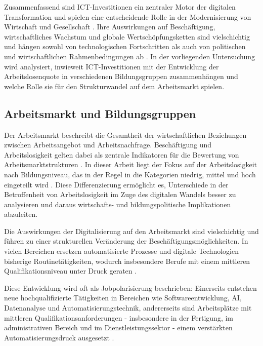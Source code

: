 Zusammenfassend sind \ac{ICT}-Investitionen ein zentraler Motor der digitalen 
Transformation und spielen eine entscheidende Rolle in der Modernisierung von Wirtschaft 
und Gesellschaft \parencite[S. 112]{brynjolfsson2015thesecond}. Ihre Auswirkungen auf 
Beschäftigung, wirtschaftliches Wachstum und globale Wertschöpfungsketten sind 
vielschichtig und hängen sowohl von technologischen Fortschritten als auch von politischen 
und wirtschaftlichen Rahmenbedingungen ab \parencite[S. 112]{brynjolfsson2015thesecond}. 
In der vorliegenden Untersuchung wird analysiert, inwieweit \ac{ICT}-Investitionen mit der 
Entwicklung der Arbeitslosenquote in verschiedenen Bildungsgruppen zusammenhängen und 
welche Rolle sie für den Strukturwandel auf dem Arbeitsmarkt spielen.


\subsection{Arbeitsmarkt und Bildungsgruppen}

Der Arbeitsmarkt beschreibt die Gesamtheit der wirtschaftlichen Beziehungen zwischen 
Arbeitsangebot und Arbeitsnachfrage. Beschäftigung und Arbeitslosigkeit gelten dabei als 
zentrale Indikatoren für die Bewertung von Arbeitsmarktstrukturen 
\parencite[S. 10ff]{acemoglu2002technical}. In dieser Arbeit liegt der Fokus auf der 
Arbeitslosigkeit nach Bildungsniveau, das in der Regel in die Kategorien niedrig, mittel 
und hoch eingeteilt wird \parencite[S. 35–37]{frey2013thefuture}. Diese Differenzierung 
ermöglicht es, Unterschiede in der Betroffenheit von Arbeitslosigkeit im Zuge des 
digitalen Wandels besser zu analysieren und daraus wirtschafts- und bildungspolitische 
Implikationen abzuleiten.

Die Auswirkungen der Digitalisierung auf den Arbeitsmarkt sind vielschichtig und führen zu 
einer strukturellen Veränderung der Beschäftigungsmöglichkeiten. In vielen Bereichen 
ersetzen automatisierte Prozesse und digitale Technologien bisherige Routinetätigkeiten, 
wodurch insbesondere Berufe mit einem mittleren Qualifikationsniveau unter Druck geraten 
\parencite[S. 44f]{frey2013thefuture}.

Diese Entwicklung wird oft als Jobpolarisierung beschrieben: Einerseits entstehen neue 
hochqualifizierte Tätigkeiten in Bereichen wie Softwareentwicklung, \ac{AI}, Datenanalyse 
und Automatisierungstechnik, andererseits sind Arbeitsplätze mit mittleren 
Qualifikationsanforderungen - insbesondere in der Fertigung, im administrativen Bereich 
und im Dienstleistungssektor - einem verstärkten Automatisierungsdruck ausgesetzt 
\parencite[S. 40]{autor2015whyare}.

